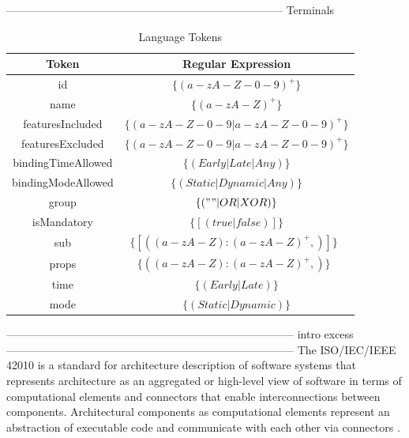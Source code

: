 ---------------------------------------------------------------------------
Terminals
\begin{table}[htbp]
\caption{Language Tokens}
\begin{center}
\begin{tabular}{|c|c|}
\hline
    Token & Regular Expression \\\hline
                             id & $\{(a-zA-Z-0-9)^+\}$  \\\hline
                             name & $\{(a-zA-Z)^+\}$ \\ \hline
                             featuresIncluded & $\{(a-zA-Z-0-9 | a-zA-Z-0-9)^+\}$  \\ \hline
                             featuresExcluded & $\{(a-zA-Z-0-9 | a-zA-Z-0-9)^+\}$\\ \hline
                             bindingTimeAllowed & $\{(Early | Late | Any)\}$\\ \hline
                             bindingModeAllowed & $\{(Static | Dynamic | Any)\}$\\\hline
                             group & $\{("" | OR | XOR)\}$\\ \hline
                             isMandatory & $\{[(true | false)]\}$\\ \hline
                             sub & $\{[({(a-zA-Z):(a-zA-Z)}^+,)]\}$\ \\ \hline
                             props & $\{({(a-zA-Z):(a-zA-Z)}^+,)\}$\ \\ \hline
                             time & $\{(Early | Late)\}$\\ \hline
                             mode & $\{(Static | Dynamic)\}$\\ \hline
\end{tabular}
\label{tab:langlex}
\end{center}
\end{table}
------------------------------------------------------------------------------
intro excess
------------------------------------------------------------------------------
The ISO/IEC/IEEE 42010 is a standard for architecture description of software systems that represents architecture as an aggregated or high-level view of software in terms of computational elements and connectors that enable interconnections between components. Architectural components as computational elements represent an abstraction of executable code and communicate with each other via connectors \cite{ref-arch}.

